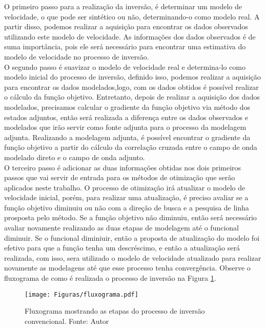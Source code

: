 O primeiro passo para a realização da inversão, é determinar um modelo de velocidade, o que pode ser sintético ou não, determinando-o como modelo real. A partir disso, podemos realizar a aquisição para encontrar os dados observados utilizando este modelo de velocidade. As informações dos dados observados é de suma importância, pois ele será necessário para encontrar uma estimativa do modelo de velocidade no processo de inversão.  \\

O segundo passo é suavizar o modelo de velocidade real e determina-lo como modelo inicial do processo de inversão, definido isso, podemos realizar a aquisição para encontrar os dados modelados,logo, com os dados obtidos é possível realizar o cálculo da função objetivo. Entretanto, depois de realizar a aquisição dos dados modelados, precisamos calcular o gradiente da função objetivo via método dos estados adjuntos, então será realizada a diferença entre os dados observados e modelados que irão servir como fonte adjunta para o processo da modelagem adjunta. Realizando a modelagem adjunta, é possível encontrar o gradiente da função objetivo a partir do cálculo da correlação cruzada entre o campo de onda modelado direto e o campo de onda adjunto. \\

O terceiro passo é adicionar as duas informações obtidas nos dois primeiros passos que vai servir de entrada para os métodos de otimização que serão aplicados neste trabalho. O processo de otimização irá atualizar o modelo de velocidade inicial, porém, para realizar uma atualização, é preciso avaliar se a função objetivo diminuiu ou não com a direção de busca e a pesquisa de linha prosposta pelo método. Se a função objetivo não diminuiu, então será necessário avaliar novamente realizando as duas etapas de modelagem até o funcional diminuir. Se o funcional diminiuir, então a proposta de atualização do modelo foi efetivo para que a função tenha um descréscimo, e então a atualização será realizada, com isso, sera utilizado o modelo de velocidade atualizado para realizar novamente as modelagens até que esse processo tenha convergência. Observe o fluxograma de como é realizada o processo de inversão na Figura \ref{fig:fluxograma_otimização}.

\begin{figure}[h!]
\centering
  \texttt{[image: Figuras/fluxograma.pdf]}
\caption{Fluxograma mostrando as etapas do processo de inversão convencional. Fonte: Autor } 
\label{fig:fluxograma_otimização}
\end{figure}


